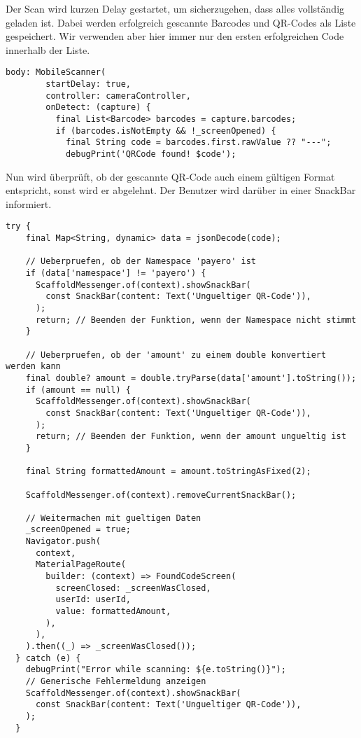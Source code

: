 Der Scan wird kurzen Delay gestartet, um sicherzugehen, dass alles vollständig geladen ist.
Dabei werden erfolgreich gescannte Barcodes und QR-Codes als Liste gespeichert.
Wir verwenden aber hier immer nur den ersten erfolgreichen Code innerhalb der Liste.

\begin{lstlisting}[caption=QR-Code gefunden, label=qr_found]
  body: MobileScanner(
        startDelay: true,
        controller: cameraController,
        onDetect: (capture) {
          final List<Barcode> barcodes = capture.barcodes;
          if (barcodes.isNotEmpty && !_screenOpened) {
            final String code = barcodes.first.rawValue ?? "---";
            debugPrint('QRCode found! $code');
\end{lstlisting}

Nun wird überprüft, ob der gescannte QR-Code auch einem gültigen Format entspricht, sonst wird er abgelehnt.
Der Benutzer wird darüber in einer SnackBar informiert.

\begin{lstlisting}[caption={QR-Code Check}]
  try {
    final Map<String, dynamic> data = jsonDecode(code);

    // Ueberpruefen, ob der Namespace 'payero' ist
    if (data['namespace'] != 'payero') {
      ScaffoldMessenger.of(context).showSnackBar(
        const SnackBar(content: Text('Ungueltiger QR-Code')),
      );
      return; // Beenden der Funktion, wenn der Namespace nicht stimmt
    }

    // Ueberpruefen, ob der 'amount' zu einem double konvertiert werden kann
    final double? amount = double.tryParse(data['amount'].toString());
    if (amount == null) {
      ScaffoldMessenger.of(context).showSnackBar(
        const SnackBar(content: Text('Ungueltiger QR-Code')),
      );
      return; // Beenden der Funktion, wenn der amount ungueltig ist
    }

    final String formattedAmount = amount.toStringAsFixed(2);

    ScaffoldMessenger.of(context).removeCurrentSnackBar();

    // Weitermachen mit gueltigen Daten
    _screenOpened = true;
    Navigator.push(
      context,
      MaterialPageRoute(
        builder: (context) => FoundCodeScreen(
          screenClosed: _screenWasClosed,
          userId: userId,
          value: formattedAmount,
        ),
      ),
    ).then((_) => _screenWasClosed());
  } catch (e) {
    debugPrint("Error while scanning: ${e.toString()}");
    // Generische Fehlermeldung anzeigen
    ScaffoldMessenger.of(context).showSnackBar(
      const SnackBar(content: Text('Ungueltiger QR-Code')),
    );
  }
\end{lstlisting}

